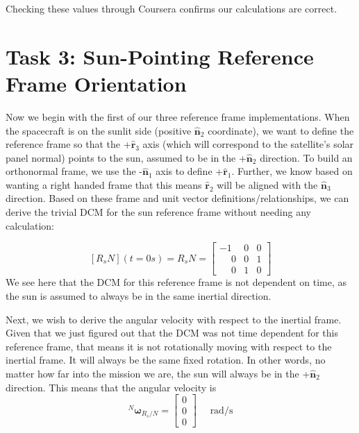 \documentclass[conf]{new-aiaa}
\begin{document}
Checking these values through Coursera confirms our calculations are correct.


















\section{Task 3: Sun-Pointing Reference Frame Orientation}
Now we begin with the first of our three reference frame implementations. When the spacecraft is on the sunlit side (positive $\hat{\bm{n}}_2$ coordinate), we want to define the reference frame so that the +$\hat{\bm{r}}_3$ axis (which will correspond to the satellite's solar panel normal) points to the sun, assumed to be in the +$\hat{\bm{n}}_2$ direction. To build an orthonormal frame, we use the -$\hat{\bm{n}}_1$ axis to define +$\hat{\bm{r}}_1$. Further, we know based on wanting a right handed frame that this means $\hat{\bm{r}}_2$ will be aligned with the $\hat{\bm{n}}_3$ direction. Based on these frame and unit vector definitions/relationships, we can derive the trivial DCM for the sun reference frame without needing any calculation:

\[
[R_sN](t = 0s) = R_sN = 
\begin{bmatrix}
-1 & 0 & 0 \\
\phantom{-}0 & 0 & 1 \\
\phantom{-}0 & 1 & 0
\end{bmatrix}
\]
We see here that the DCM for this reference frame is not dependent on time, as the sun is assumed to always be in the same inertial direction.

Next, we wish to derive the angular velocity with respect to the inertial frame. Given that we just figured out that the DCM was not time dependent for this reference frame, that means it is not rotationally moving with respect to the inertial frame. It will always be the same fixed rotation. In other words, no matter how far into the mission we are, the sun will always be in the +$\hat{\bm{n}}_2$ direction. This means that the angular velocity is 
\[
{}^N\bm{\omega}_{R_s/N} = 
\begin{bmatrix}
0 \\ 0 \\ 0
\end{bmatrix} \quad\text{ rad/s}
\]
\end{document}
